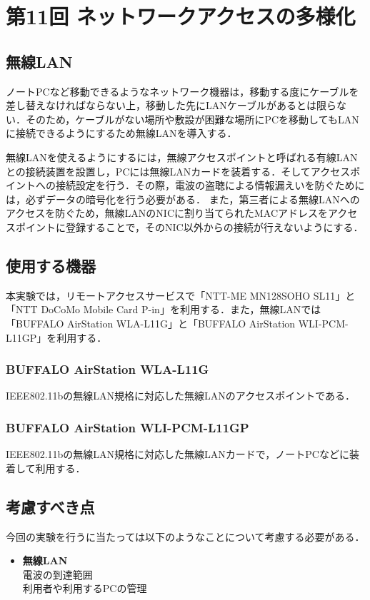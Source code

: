 \section{第11回 ネットワークアクセスの多様化}


\subsection*{無線LAN}
ノートPCなど移動できるようなネットワーク機器は，移動する度にケーブルを差し替えなければならない上，移動した先にLANケーブルがあるとは限らない．そのため，ケーブルがない場所や敷設が困難な場所にPCを移動してもLANに接続できるようにするため無線LANを導入する．

無線LANを使えるようにするには，無線アクセスポイントと呼ばれる有線LANとの接続装置を設置し，PCには無線LANカードを装着する．そしてアクセスポイントへの接続設定を行う．その際，電波の盗聴による情報漏えいを防ぐためには，必ずデータの暗号化を行う必要がある．
また，第三者による無線LANへのアクセスを防ぐため，無線LANのNICに割り当てられたMACアドレスをアクセスポイントに登録することで，そのNIC以外からの接続が行えないようにする．

\subsection*{使用する機器}
本実験では，リモートアクセスサービスで「NTT-ME MN128SOHO SL11」と「NTT DoCoMo Mobile Card P-in」を利用する．また，無線LANでは「BUFFALO AirStation WLA-L11G」と「BUFFALO AirStation WLI-PCM-L11GP」を利用する．
\subsubsection*{BUFFALO AirStation WLA-L11G}
IEEE802.11bの無線LAN規格に対応した無線LANのアクセスポイントである．
\subsubsection*{BUFFALO AirStation WLI-PCM-L11GP}
IEEE802.11bの無線LAN規格に対応した無線LANカードで，ノートPCなどに装着して利用する．

\subsection*{考慮すべき点}
今回の実験を行うに当たっては以下のようなことについて考慮する必要がある．
\begin{itemize}
  \item \textbf{無線LAN}\\
         電波の到達範囲\\
         利用者や利用するPCの管理
\end{itemize}
